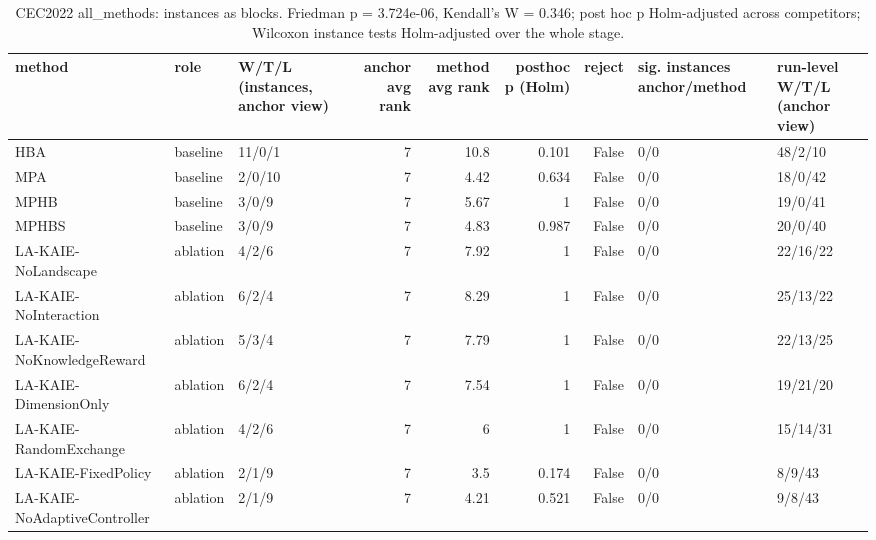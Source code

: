 \begin{table}[t]
\centering
\scriptsize
\caption{CEC2022 all_methods: instances as blocks. Friedman p = 3.724e-06, Kendall's W = 0.346; post hoc p Holm-adjusted across competitors; Wilcoxon instance tests Holm-adjusted over the whole stage.}
\label{tab:cec2022_all_methods_global}
\begin{tabular}{lllrrrrll}
\toprule
method & role & W/T/L (instances, anchor view) & anchor avg rank & method avg rank & posthoc p (Holm) & reject & sig. instances anchor/method & run-level W/T/L (anchor view) \\
\midrule
HBA & baseline & 11/0/1 & 7 & 10.8 & 0.101 & False & 0/0 & 48/2/10 \\
MPA & baseline & 2/0/10 & 7 & 4.42 & 0.634 & False & 0/0 & 18/0/42 \\
MPHB & baseline & 3/0/9 & 7 & 5.67 & 1 & False & 0/0 & 19/0/41 \\
MPHBS & baseline & 3/0/9 & 7 & 4.83 & 0.987 & False & 0/0 & 20/0/40 \\
LA-KAIE-NoLandscape & ablation & 4/2/6 & 7 & 7.92 & 1 & False & 0/0 & 22/16/22 \\
LA-KAIE-NoInteraction & ablation & 6/2/4 & 7 & 8.29 & 1 & False & 0/0 & 25/13/22 \\
LA-KAIE-NoKnowledgeReward & ablation & 5/3/4 & 7 & 7.79 & 1 & False & 0/0 & 22/13/25 \\
LA-KAIE-DimensionOnly & ablation & 6/2/4 & 7 & 7.54 & 1 & False & 0/0 & 19/21/20 \\
LA-KAIE-RandomExchange & ablation & 4/2/6 & 7 & 6 & 1 & False & 0/0 & 15/14/31 \\
LA-KAIE-FixedPolicy & ablation & 2/1/9 & 7 & 3.5 & 0.174 & False & 0/0 & 8/9/43 \\
LA-KAIE-NoAdaptiveController & ablation & 2/1/9 & 7 & 4.21 & 0.521 & False & 0/0 & 9/8/43 \\
\bottomrule
\end{tabular}
\end{table}
